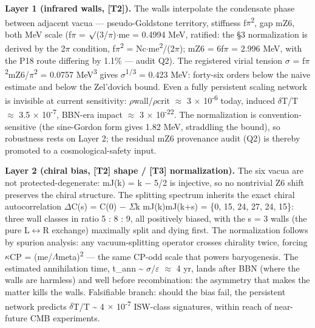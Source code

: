 \documentclass[11pt,letterpaper]{article}
\begin{document}
\noindent \textbf{Layer 1 (infrared walls, [T2]). }The walls interpolate the condensate phase between adjacent vacua --- pseudo-Goldstone territory, stiffness f$\pi$\textsuperscript{2}, gap mZ6, both MeV scale (f$\pi$ = $\surd$(3/$\pi$)$\cdot$me = 0.4994 MeV, ratified: the §3 normalization is derived by the 2$\pi$ condition, f$\pi$\textsuperscript{2} = Nc$\cdot$me\textsuperscript{2}/(2$\pi$); mZ6 = 6f$\pi$ = 2.996 MeV, with the P18 route differing by 1.1\% --- audit Q2). The registered virial tension $\sigma$ = f$\pi$\textsuperscript{2}mZ6/$\pi$\textsuperscript{2} = 0.0757 MeV\textsuperscript{3} gives $\sigma$\textsuperscript{1/3} = 0.423 MeV: forty-six orders below the naive estimate and below the Zel'dovich bound. Even a fully persistent scaling network is invisible at current sensitivity: $\rho$wall/$\rho$crit $\approx$ 3 $\times$ 10\textsuperscript{-6} today, induced $\delta$T/T $\approx$ 3.5 $\times$ 10\textsuperscript{-7}, BBN-era impact $\approx$ 3 $\times$ 10\textsuperscript{-22}. The normalization is convention-sensitive (the sine-Gordon form gives 1.82 MeV, straddling the bound), so robustness rests on Layer 2; the residual mZ6 provenance audit (Q2) is thereby promoted to a cosmological-safety input.

\noindent \textbf{Layer 2 (chiral bias, [T2] shape / [T3] normalization). }The six vacua are not protected-degenerate: mJ(k) = k $-$ 5/2 is injective, so no nontrivial Z6 shift preserves the chiral structure. The splitting spectrum inherits the exact chiral autocorrelation $\Delta$C(s) = C(0) $-$ $\Sigma$k mJ(k)mJ(k+s) = \{0, 15, 24, 27, 24, 15\}: three wall classes in ratio 5 : 8 : 9, all positively biased, with the s = 3 walls (the pure L$\leftrightarrow$R exchange) maximally split and dying first. The normalization follows by spurion analysis: any vacuum-splitting operator crosses chirality twice, forcing $\kappa$CP = (me/$\Lambda$meta)\textsuperscript{2} --- the same CP-odd scale that powers baryogenesis. The estimated annihilation time, t\_ann \textasciitilde{} $\sigma$/$\varepsilon$ $\approx$ 4 yr, lands after BBN (where the walls are harmless) and well before recombination: the asymmetry that makes the matter kills the walls. Falsifiable branch: should the bias fail, the persistent network predicts $\delta$T/T \textasciitilde{} 4 $\times$ 10\textsuperscript{-7} ISW-class signatures, within reach of near-future CMB experiments.
\end{document}
